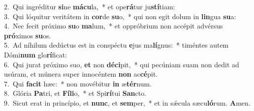 {2.~}Qui ingréditur \textbf{si}ne \textbf{má}\textbf{cu}la,~* et ope\textbf{rá}tur ju\textbf{stí}tiam:\\
{3.~}Qui lóquitur veritátem in \textbf{cor}de \textbf{su}o,~* qui non egit dolum in \textbf{lin}gua \textbf{su}a:\\
{4.~}Nec fecit próximo \textbf{su}o \textbf{ma}lum,~* et oppróbrium non accépit advérsus \textbf{pró}ximos \textbf{su}os.\\
{5.~}Ad níhilum dedúctus est in conspéctu \textbf{e}jus ma\textbf{lí}gnus:~* timéntes autem Dómi\textbf{num} glo\textbf{rí}ficat:\\
{6.~}Qui jurat próximo suo, \textbf{et} non \textbf{dé}\textbf{ci}pit,~* qui pecúniam suam non dedit ad usúram, et múnera super innocéntem \textbf{non} ac\textbf{cé}pit.\\
{7.~}Qui \textbf{fa}\textbf{cit} hæc:~* non movébitur \textbf{in} æ\textbf{tér}num.\\
{8.~}Glória \textbf{Pa}tri, et \textbf{Fí}\textbf{li}o,~* et Spi\textbf{rí}tui \textbf{San}cto.\\
{9.~}Sicut erat in princípio, et \textbf{nunc}, et \textbf{sem}per,~* et in sǽcula sæcu\textbf{ló}rum. \textbf{A}men.\\
